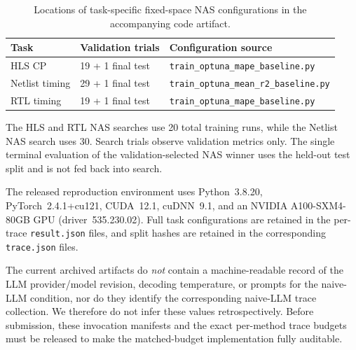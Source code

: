 \begin{table}[t]
\centering
\caption{Locations of task-specific fixed-space NAS configurations in the accompanying code artifact.}
\label{tab:nas_configs}
\small
\begin{tabularx}{\textwidth}{@{}l l >{\raggedright\arraybackslash}X@{}}
\toprule
\textbf{Task} & \textbf{Validation trials} & \textbf{Configuration source} \\
\midrule
HLS CP & 19 + 1 final test & \texttt{train\_\allowbreak{}optuna\_\allowbreak{}mape\_\allowbreak{}baseline.py} \\
Netlist timing & 29 + 1 final test & \texttt{train\_\allowbreak{}optuna\_\allowbreak{}mean\_\allowbreak{}r2\_\allowbreak{}baseline.py} \\
RTL timing & 19 + 1 final test & \texttt{train\_\allowbreak{}optuna\_\allowbreak{}mape\_\allowbreak{}baseline.py} \\
\bottomrule
\end{tabularx}
\end{table}

The HLS and RTL NAS searches use 20 total training runs, while the Netlist NAS search uses 30. Search trials observe validation metrics only. The single terminal evaluation of the validation-selected NAS winner uses the held-out test split and is not fed back into search.

The released reproduction environment uses Python~3.8.20, PyTorch~2.4.1+cu121, CUDA~12.1, cuDNN~9.1, and an NVIDIA A100-SXM4-80GB GPU (driver~535.230.02). Full task configurations are retained in the per-trace \texttt{result.json} files, and split hashes are retained in the corresponding \texttt{trace.json} files.

The current archived artifacts do \emph{not} contain a machine-readable record of the LLM provider/model revision, decoding temperature, or prompts for the naive-LLM condition, nor do they identify the corresponding naive-LLM trace collection. We therefore do not infer these values retrospectively. Before submission, these invocation manifests and the exact per-method trace budgets must be released to make the matched-budget implementation fully auditable.
